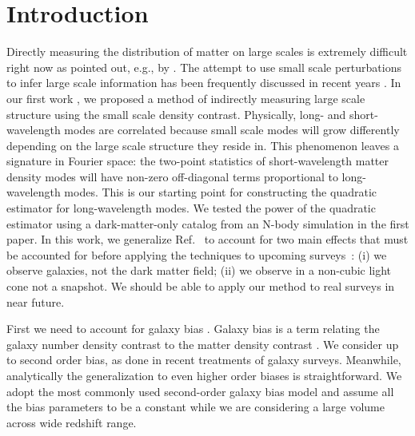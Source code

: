 \documentclass[prd,amsmath,amssymb,floatfix,superscriptaddress,nofootinbib,twocolumn]{revtex4-1}
\begin{document}
\section{Introduction} \label{sec1}
\noindent Directly measuring the distribution of matter on large scales is extremely difficult right now as pointed out, e.g., by \cite{Modi:2019hydr}. The attempt to use small scale perturbations to infer large scale information has been frequently discussed in recent years \cite{Baldauf:2011fer}\cite{Jeong:2012foss}\cite{Li:2014ssc}\cite{Zhu:2016tidal}\cite{Barreira:2017res}. In our first work \cite{Li:2020fir}, we proposed a method of indirectly measuring large scale structure using the small scale density contrast. Physically, long- and short-wavelength modes are correlated because small scale modes will grow differently depending on the large scale structure they reside in. This phenomenon leaves a signature in Fourier space: the two-point statistics of short-wavelength matter density modes will have non-zero off-diagonal terms proportional to long-wavelength modes. This is our starting point for constructing the quadratic estimator for long-wavelength modes. We tested the power of the quadratic estimator using a dark-matter-only catalog from an N-body simulation in the first paper. In this work, we generalize Ref.~\cite{Li:2020fir} to account for two main effects that must be accounted for before applying the techniques to upcoming surveys~\cite{LSST:2012ls}\cite{Wfirst:2012jg}\cite{DESI:2019ds}: (i) we observe galaxies, not the dark matter field; (ii) we observe in a non-cubic light cone not a snapshot. We should be able to apply our method to real surveys in near future.

First we need to account for galaxy bias \cite{Kravtsov:1999hb}\cite{Desjacques:2018rev}. Galaxy bias is a term relating the galaxy number density contrast to the matter density contrast \cite{Gil-Marin:2014sta}\cite{Gil-Marin:2016wya}. We consider up to second order bias, as done in recent treatments of galaxy surveys. Meanwhile, analytically the generalization to even higher order biases is straightforward. We adopt the most commonly used second-order galaxy bias model and assume all the bias parameters to be a constant while we are considering a large volume across wide redshift range.
\end{document}
